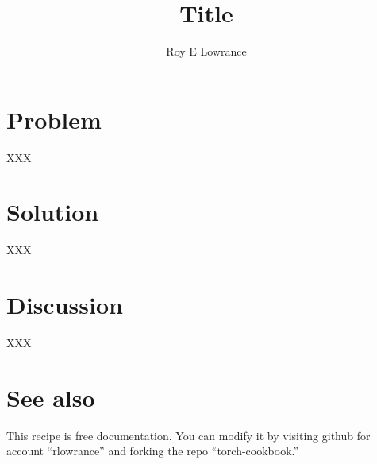 \documentclass{article}
\begin{document}
\title{Title}
\author{Roy E Lowrance}
\maketitle


\section{Problem}

XXX

\section{Solution}

XXX

\section{Discussion}

XXX

\section{See also}

This recipe is free documentation. You can modify it by visiting
github for account ``rlowrance'' and forking the repo
``torch-cookbook.''
\end{document}
